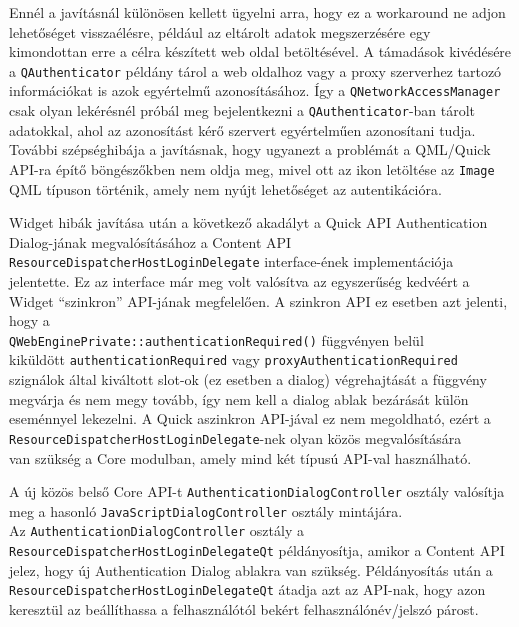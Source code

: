 \documentclass[12pt]{report}
\begin{document}
Ennél a javításnál különösen kellett ügyelni arra, hogy ez a workaround ne adjon lehetőséget
visszaélésre, például az eltárolt adatok megszerzésére egy kimondottan erre a célra
készített web oldal betöltésével. A támadások kivédésére a \texttt{QAuthenticator} példány
tárol a web oldalhoz vagy a proxy szerverhez tartozó információkat is azok egyértelmű
azonosításához. Így a \texttt{QNetworkAccessManager} csak olyan lekérésnél próbál meg
bejelentkezni a \texttt{QAuthenticator}-ban tárolt adatokkal, ahol az azonosítást kérő
szervert egyértelműen azonosítani tudja. További szépséghibája a javításnak, hogy
ugyanezt a problémát a QML/Quick API-ra építő böngészőkben nem oldja meg, mivel ott az ikon
letöltése az \texttt{Image} QML típuson történik, amely nem nyújt lehetőséget az
autentikációra.

Widget hibák javítása után a következő akadályt a Quick API Authentication Dialog-jának
megvalósításához a Content API \\
\texttt{ResourceDispatcherHostLoginDelegate} interface-ének implementációja jelentette.
Ez az interface már meg volt valósítva az egyszerűség kedvéért a Widget ``szinkron''
API-jának megfelelően. A szinkron API ez esetben azt jelenti, hogy a \\
\texttt{QWebEnginePrivate::authenticationRequired()} függvényen belül \\
kiküldött \texttt{authenticationRequired} vagy \texttt{proxyAuthenticationRequired}
szignálok által kiváltott slot-ok (ez esetben a dialog) végrehajtását a függvény megvárja
és nem megy tovább, így nem kell a dialog ablak bezárását külön eseménnyel lekezelni.
A Quick aszinkron API-jával ez nem megoldható, ezért a \\
\texttt{ResourceDispatcherHostLoginDelegate}-nek olyan közös megvalósítására \\
van szükség a Core modulban, amely mind két típusú API-val használható.

A új közös belső Core API-t \texttt{AuthenticationDialogController} osztály valósítja meg
a hasonló \texttt{JavaScriptDialogController} osztály mintájára. \\
Az \texttt{AuthenticationDialogController} osztály a \\
\texttt{ResourceDispatcherHostLoginDelegateQt} példányosítja, amikor a Content API jelez,
hogy új Authentication Dialog ablakra van szükség. Példányosítás után a \\
\texttt{ResourceDispatcherHostLoginDelegateQt} átadja azt az API-nak, hogy azon keresztül
az beállíthassa a felhasználótól bekért felhasználónév/jelszó párost.
\end{document}
